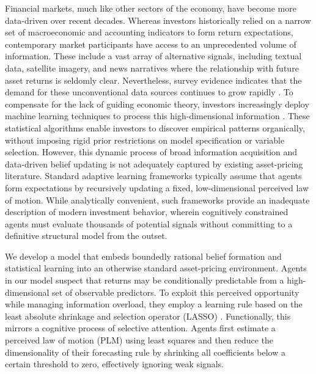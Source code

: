 \documentclass[11pt]{article}
\begin{document}
Financial markets, much like other sectors of the economy, have become more data-driven over recent decades.
Whereas investors historically relied on a narrow set of macroeconomic and accounting indicators to form return expectations, contemporary market participants have access to an unprecedented volume of information.
These include a vast array of alternative signals, including textual data, satellite imagery, and news narratives where the relationship with future asset returns is seldomly clear.
Nevertheless, survey evidence indicates that the demand for these unconventional data sources continues to grow rapidly \citep{lowenstein_sandler_2026}.
To compensate for the lack of guiding economic theory, investors increasingly deploy machine learning techniques to process this high-dimensional information \citep{cfa_invesco_2024}.
These statistical algorithms enable investors to discover empirical patterns organically, without imposing rigid prior restrictions on model specification or variable selection.
However, this dynamic process of broad information acquisition and data-driven belief updating is not adequately captured by existing asset-pricing literature.
Standard adaptive learning frameworks typically assume that agents form expectations by recursively updating a fixed, low-dimensional perceived law of motion.
While analytically convenient, such frameworks provide an inadequate description of modern investment behavior, wherein cognitively constrained agents must evaluate thousands of potential signals without committing to a definitive structural model from the outset.

We develop a model that embeds boundedly rational belief formation and statistical learning into an otherwise standard asset-pricing environment.
Agents in our model suspect that returns may be conditionally predictable from a high-dimensional set of observable predictors.
To exploit this perceived opportunity while managing information overload, they employ a learning rule based on the least absolute shrinkage and selection operator (LASSO) \citep{Tibshirani1996}.
Functionally, this mirrors a cognitive process of selective attention.
Agents first estimate a perceived law of motion (PLM) using least squares and then reduce the dimensionality of their forecasting rule by shrinking all coefficients below a certain threshold to zero, effectively ignoring weak signals.
\end{document}
